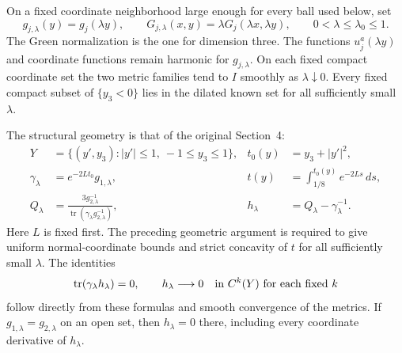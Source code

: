 \documentclass[11pt]{article}
\theoremstyle{definition}
\theoremstyle{remark}
\numberwithin{equation}{section}
\begin{document}
On a fixed coordinate neighborhood large enough for every ball used
below, set
\[
 g_{j,\lambda}(y)=g_j(\lambda y),\qquad
 G_{j,\lambda}(x,y)=\lambda G_j(\lambda x,\lambda y),
 \qquad 0<\lambda\leq\lambda_0\leq1.
\]
The Green normalization is the one for dimension three.  The functions
$u_j^a(\lambda y)$ and coordinate functions remain harmonic for
$g_{j,\lambda}$.  On each fixed compact coordinate set the two metric
families tend to $I$ smoothly as $\lambda\downarrow0$.  Every fixed
compact subset of $\{y_3<0\}$ lies in the dilated known set for all
sufficiently small $\lambda$.

The structural geometry is that of the original Section~4:
\begin{align*}
 Y&=\{(y',y_3):|y'|\leq1,\ -1\leq y_3\leq1\},&
 t_0(y)&=y_3+|y'|^2,\\
 \gamma_\lambda&=e^{-2Lt_0}g_{1,\lambda},&
 t(y)&=\int_{1/8}^{t_0(y)}e^{-2Ls}\,ds,\\
 Q_\lambda&=\frac{3g_{2,\lambda}^{-1}}
                  {\operatorname{tr}(\gamma_\lambda g_{2,\lambda}^{-1})},&
 h_\lambda&=Q_\lambda-\gamma_\lambda^{-1}.
\end{align*}
Here $L$ is fixed first.  The preceding geometric argument is required
to give uniform normal-coordinate bounds and strict concavity of $t$
for all sufficiently small $\lambda$.  The identities
\[
 \operatorname{tr}(\gamma_\lambda h_\lambda)=0,
 \qquad h_\lambda\longrightarrow0\quad\hbox{in }C^k(Y)
                       \text{ for each fixed }k
\]
follow directly from these formulas and smooth convergence of the
metrics.  If $g_{1,\lambda}=g_{2,\lambda}$ on an open set, then
$h_\lambda=0$ there, including every coordinate derivative of $h_\lambda$.
\end{document}
